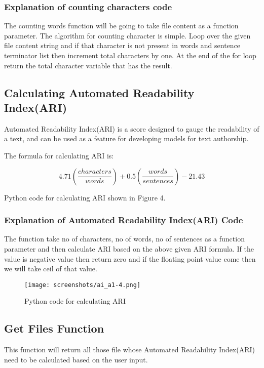 \documentclass{article}
\begin{document}
\subsubsection{Explanation of counting characters code}

The counting words function will be going to take file content as a function parameter. The algorithm for counting character is simple. Loop over the given file content string and if that character is not present in words and sentence terminator list then increment total characters by one. At the end of the for loop return the total character variable that has the result.





\subsection{Calculating Automated Readability Index(ARI)}
Automated Readability Index(ARI) is a score designed to gauge the readability of a text, and can be used as a feature for developing models for text authorship.
\

The formula for calculating ARI is:

\[ 
  4.71 \left( \frac{characters}{words} \right) + 0.5  \left( \frac{words}{sentences} \right) - 21.43
\]

Python code for calculating ARI shown in Figure 4.


\subsubsection{Explanation of Automated Readability Index(ARI) Code}

The function take no of characters, no of words, no of sentences as a function parameter and then calculate ARI based on the above given ARI formula. If the value is negative value then return zero and if the floating point value come then we will take ceil of that value. 


\begin{figure}
\centering
\texttt{[image: screenshots/ai\_a1-4.png]}
\caption{\label{fig:python_code_calcualte_ari}Python code for calculating ARI}
\end{figure}

\subsection{Get Files Function}
This function will return all those file whose Automated Readability Index(ARI) need to be calculated based on the user input.
\end{document}
